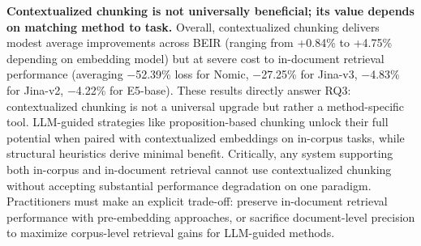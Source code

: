 \textbf{Contextualized chunking is not universally beneficial; its value depends on matching method to task.} Overall, contextualized chunking delivers modest average improvements across BEIR (ranging from +0.84\% to +4.75\% depending on embedding model) but at severe cost to in-document retrieval performance (averaging $-$52.39\% loss for Nomic, $-$27.25\% for Jina-v3, $-$4.83\% for Jina-v2, $-$4.22\% for E5-base). These results directly answer RQ3: contextualized chunking is not a universal upgrade but rather a method-specific tool. LLM-guided strategies like proposition-based chunking unlock their full potential when paired with contextualized embeddings on in-corpus tasks, while structural heuristics derive minimal benefit. Critically, any system supporting both in-corpus and in-document retrieval cannot use contextualized chunking without accepting substantial performance degradation on one paradigm. Practitioners must make an explicit trade-off: preserve in-document retrieval performance with pre-embedding approaches, or sacrifice document-level precision to maximize corpus-level retrieval gains for LLM-guided methods.




